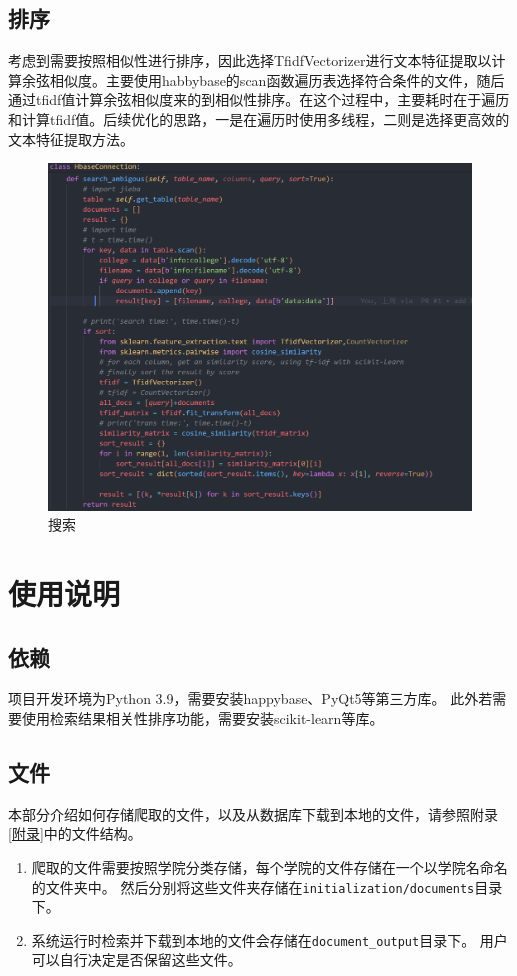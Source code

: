 \documentclass{article}
\begin{document}
	\subsection{排序}
	考虑到需要按照相似性进行排序，因此选择TfidfVectorizer进行文本特征提取以计算余弦相似度。主要使用habbybase的scan函数遍历表选择符合条件的文件，随后通过tfidf值计算余弦相似度来的到相似性排序。在这个过程中，主要耗时在于遍历和计算tfidf值。后续优化的思路，一是在遍历时使用多线程，二则是选择更高效的文本特征提取方法。
	\begin{figure}[h]
		\centering
		\includegraphics[width=0.6\linewidth]{sort}
		\caption{搜索}
		\label{fig:sort}
	\end{figure}
	
	\section{使用说明}
	\subsection{依赖}
	项目开发环境为Python 3.9，需要安装happybase、PyQt5等第三方库。
	此外若需要使用检索结果相关性排序功能，需要安装scikit-learn等库。
	
	\subsection{文件}
	本部分介绍如何存储爬取的文件，以及从数据库下载到本地的文件，请参照附录\ref{附录}中的文件结构。
		\begin{enumerate}
			\item
			爬取的文件需要按照学院分类存储，每个学院的文件存储在一个以学院名命名的文件夹中。
			然后分别将这些文件夹存储在\texttt{initialization/documents}目录下。
			\item
			系统运行时检索并下载到本地的文件会存储在\texttt{document\_output}目录下。
			用户可以自行决定是否保留这些文件。
		\end{enumerate}
	
\end{document}
